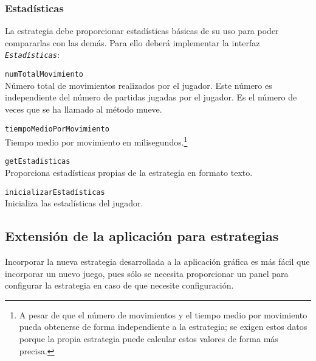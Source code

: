 \subsubsection{Estadísticas}
\label{ssec:estadisticas}
La estrategia debe proporcionar estadísticas básicas de su uso para poder compararlas con las demás.
Para ello deberá implementar la interfaz \texttt{\textit{Estadísticas}}:
\begin{description}
	\item \texttt{numTotalMovimiento}\\
	Número total de movimientos realizados por el jugador. Este número es independiente del número de partidas jugadas por el jugador. Es el número de veces que se ha llamado al método mueve.
	\item \texttt{tiempoMedioPorMovimiento}\\
	Tiempo medio por movimiento en milisegundos.\footnote{A pesar de que el número de movimientos y el tiempo medio por movimiento pueda obtenerse de forma independiente a la estrategia; se exigen estos datos porque la propia estrategia puede calcular estos valores de forma más precisa.}
	\item \texttt{getEstadisticas} \\
	Proporciona estadísticas propias de la estrategia en formato texto.
	\item \texttt{inicializarEstadísticas}\\
	Inicializa las estadísticas del jugador.
\end{description}


\subsection{Extensión de la aplicación para estrategias}
\label{ssec:extension_aplicacion_estrategias}
Incorporar la nueva estrategia desarrollada a la aplicación gráfica es más fácil que incorporar un nuevo juego, pues sólo se necesita proporcionar un panel para configurar la estrategia en caso de que necesite configuración.

